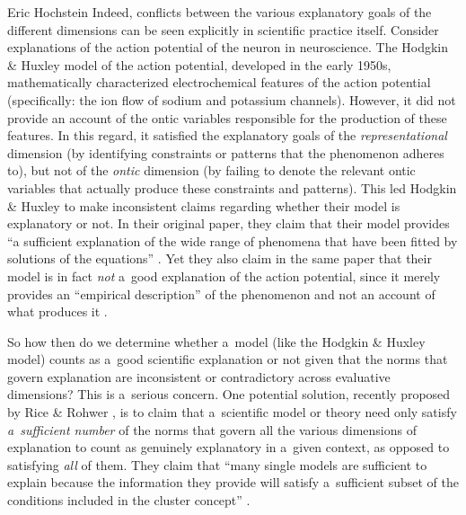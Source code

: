 \begin{artengenv}{Eric Hochstein}
Indeed, conflicts between the various explanatory goals of the different dimensions can be seen explicitly in scientific practice itself. Consider explanations of the action potential of the neuron in neuroscience. The Hodgkin \& Huxley model of the action potential, developed in the early 1950s, mathematically characterized electrochemical features of the action potential (specifically: the ion flow of sodium and potassium channels). However, it did not provide an account of the ontic variables responsible for the production of these features. In this regard, it satisfied the explanatory goals of the \textit{representational} dimension (by identifying constraints or patterns that the phenomenon adheres to), but not of the \textit{ontic} dimension (by failing to denote the relevant ontic variables that actually produce these constraints and patterns). This led Hodgkin \& Huxley to make inconsistent claims regarding whether their model is explanatory or not. In their original paper, they claim that their model provides ``a sufficient explanation of the wide range of phenomena that have been fitted by solutions of the equations''
\parencite[][p.541]{hodgkin_quantitative_1952}. %
 Yet they also claim in the same paper that their model is in fact \textit{not} a~good explanation of the action potential, since it merely provides an ``empirical description'' of the phenomenon and not an account of what produces it 
\parencites[][p.541]{hodgkin_quantitative_1952}[for the discussion, see also:][]{bogen_regularities_2005}{craver_when_2006}.


So how then do we determine whether a~model (like the Hodgkin \& Huxley model) counts as a~good scientific explanation or not given that the norms that govern explanation are inconsistent or contradictory across evaluative dimensions? This is a~serious concern. One potential solution, recently proposed by Rice \& Rohwer
\parencite*[][]{rice_how_2020}, %
 is to claim that a~scientific model or theory need only satisfy \textit{a~sufficient number} of the norms that govern all the various dimensions of explanation to count as genuinely explanatory in a~given context, as opposed to satisfying \textit{all} of them. They claim that ``many single models are sufficient to explain because the information they provide will satisfy a~sufficient subset of the conditions included in the cluster concept'' 
\parencite[][p.1043]{rice_how_2020}.%



\end{artengenv}
